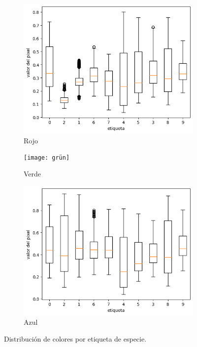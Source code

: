 \documentclass{article}
\begin{document}
\begin{figure}
	\centering
	\begin{subfigure}[b]{0.32\textwidth}
		\includegraphics[width= \textwidth]{rot}
		\caption{Rojo}
		\label{fg:rot}
	\end{subfigure}
	\begin{subfigure}[b]{0.32\textwidth}
		\texttt{[image: grün]}
		\caption{Verde}
		\label{fg:grün}
	\end{subfigure}
	\begin{subfigure}[b]{0.32\textwidth}
		\includegraphics[width= \textwidth]{blau}
		\caption{Azul}
		\label{fg:blau}
	\end{subfigure}
	\caption{Distribución de colores por etiqueta de especie.}
	\label{fg:promediosBox}
\end{figure}
\end{document}
